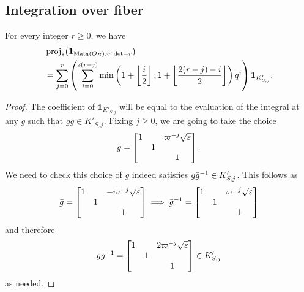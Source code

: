 \subsection{Integration over fiber}
\begin{proposition}
  For every integer $r \ge 0$, we have
  \begin{align*}
    &\operatorname{proj}_\ast(\mathbf{1}_{\operatorname{Mat}_3(O_E), v\circ\det=r}) \\
    &= \sum_{j=0}^r \left(
      \sum_{i=0}^{2(r-j)} \min \left( 1 + \left\lfloor \frac i2 \right\rfloor,
        1 + \left\lfloor \frac{2(r-j)-i}{2} \right\rfloor \right) q^i \right)
        \mathbf{1}_{K'_{S,j}}.
  \end{align*}
\end{proposition}
\begin{proof}
  The coefficient of $\mathbf{1}_{K'_{S,j}}$ will be equal to
  the evaluation of the integral at any $g$ such that $g\bar{g} \in K'_{S,j}$.
  Fixing $j \ge 0$, we are going to take the choice
  \[
    g = \begin{bmatrix}
      1 &   & \varpi^{-j} \sqrt{\varepsilon} \\
      & 1 \\
      &   & 1
    \end{bmatrix}.
  \]
  We need to check this choice of $g$ indeed satisfies $g\bar{g}^{-1} \in K'_{S,j}$.
  This follows as
  \[ \bar{g} = \begin{bmatrix} 1 &   & -\varpi^{-j} \sqrt{\varepsilon} \\ & 1 \\ &   & 1 \end{bmatrix}
    \implies \bar{g}^{-1} = \begin{bmatrix} 1 &   & \varpi^{-j} \sqrt{\varepsilon} \\ & 1 \\ &   & 1 \end{bmatrix}
  \]
  and therefore
  \[
    g\bar{g}^{-1} = \begin{bmatrix}
      1 &   & 2\varpi^{-j} \sqrt{\varepsilon} \\
      & 1 \\
      &   & 1
    \end{bmatrix} \in K'_{S,j}
  \]
  as needed.


\end{proof}
